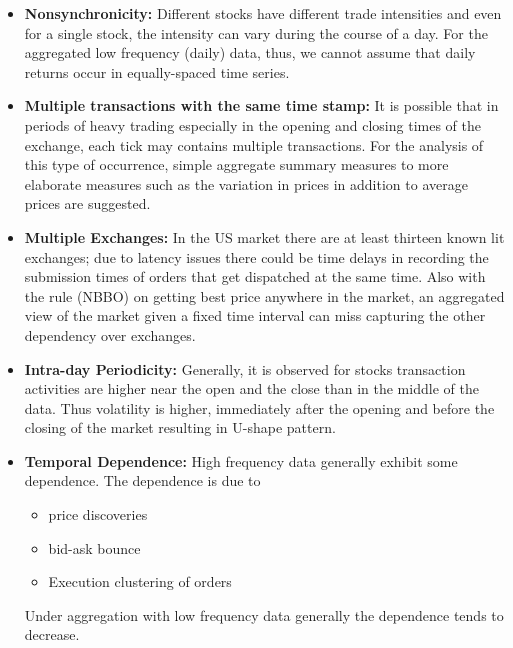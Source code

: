 \begin{itemize}
\item \textbf{Nonsynchronicity:} Different stocks have different trade intensities and even for a single stock, the intensity can vary during the course of a day. For the aggregated low frequency (daily) data, thus, we cannot assume that daily returns occur in equally-spaced time series.

\item \textbf{Multiple transactions with the same time stamp:} It is possible that in periods of heavy trading especially in the opening and closing times of the exchange, each tick may contains multiple transactions. For the analysis of this type of occurrence, simple aggregate summary measures to more elaborate measures such as the variation in prices in addition to average prices are suggested.

\item \textbf{Multiple Exchanges:} In the US market there are at least thirteen known lit exchanges; due to latency issues there could be time delays in recording the submission times of orders that get dispatched at the same time. Also with the rule (NBBO) on getting best price anywhere in the market, an aggregated view of the market given a fixed time interval can miss capturing the other dependency over exchanges. 

\item \textbf{Intra-day Periodicity:} Generally, it is observed for stocks transaction activities are higher near the open and the close than in the middle of the data. Thus volatility is higher, immediately after the opening and before the closing of the market resulting in U-shape pattern.

\item \textbf{Temporal Dependence:} High frequency data generally exhibit some dependence. The dependence is due to
        \begin{itemize}
        \item price discoveries
        \item bid-ask bounce
        \item Execution clustering of orders
        \end{itemize}
Under aggregation with low frequency data generally the dependence tends to decrease.


\end{itemize}
